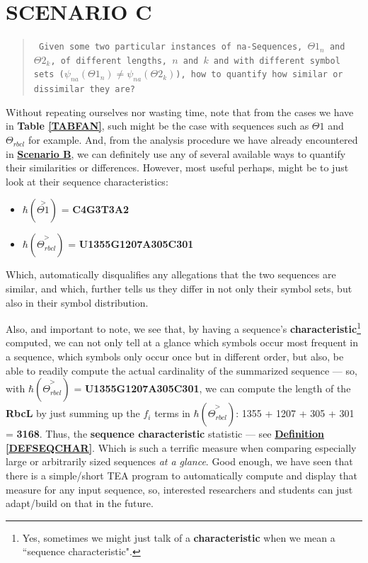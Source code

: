 \documentclass[a4paper, 18pt]{book} %
\begin{document}
\section{SCENARIO C}
\label{SECSCENC}

\begin{quote}
\small
\texttt{
Given some two particular instances of na-Sequences, $\Theta1_n$ and $\Theta2_k$, of different lengths, $n$ and $k$ and with different symbol sets ($\psi_{na}(\Theta1_n) \neq \psi_{na}(\Theta2_k)$), how to quantify how similar or dissimilar they are?}
\end{quote}

Without repeating ourselves nor wasting time, note that from the cases we have in \textbf{Table \ref{TABFAN}}, such might be the case with sequences such as $\Theta1$ and $\Theta_{rbcl}$ for example. And, from the analysis procedure we have already encountered in \textbf{\hyperref[SECSCENB]{Scenario B}}, we can definitely use any of several available ways to quantify their similarities or differences. However, most useful perhaps, might be to just look at their sequence characteristics:

\begin{itemize}
\item $\hbar(\overset{>}{\Theta1})$ = \textbf{C4G3T3A2}
\item $\hbar(\overset{>}{\Theta_{rbcl}})$ = \textbf{U1355G1207A305C301}
\end{itemize}

Which, automatically disqualifies any allegations that the two sequences are similar, and which, further tells us they differ in not only their symbol sets, but also in their symbol distribution.

Also, and important to note, we see that, by having a sequence's \textbf{characteristic}\footnote{Yes, sometimes we might just talk of a \textbf{characteristic} when we mean a ``sequence characteristic".} computed, we can not only tell at a glance which symbols occur most frequent in a sequence, which symbols only occur once but in different order, but also, be able to readily compute the actual cardinality of the summarized sequence --- so, with $\hbar(\overset{>}{\Theta_{rbcl}})$ = \textbf{U1355G1207A305C301}, we can compute the length of the \textbf{RbcL} by just summing up the $f_i$ terms in $\hbar(\overset{>}{\Theta_{rbcl}})$: 1355 + 1207 + 305 + 301 = \textbf{3168}. Thus, the \textbf{sequence characteristic} statistic --- see \textbf{\hyperref[DEFSEQCHAR]{Definition \ref{DEFSEQCHAR}}}. Which is such a terrific measure when comparing especially large or arbitrarily sized sequences \textit{at a glance}. Good enough, we have seen that there is a simple/short TEA program to automatically compute and display that measure for any input sequence, so, interested researchers and students can just adapt/build on that in the future.
\end{document}
